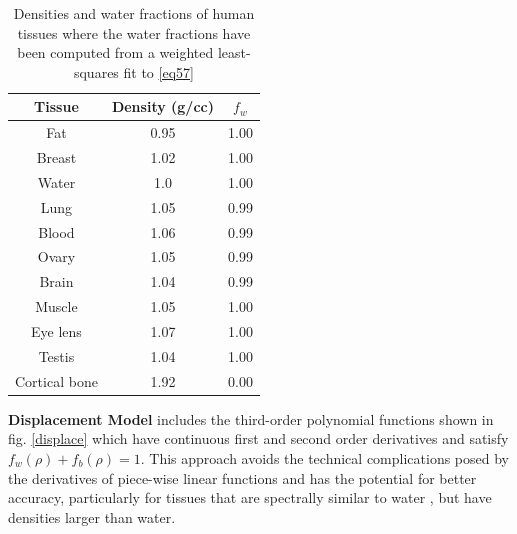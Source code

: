 \begin{table}[]
\centering
 \begin{tabular}{|c|c|c|} 
 \hline
 Tissue & Density (g/cc) & $f_w$ \\ \hline
 Fat & 0.95  & 1.00 \\  \hline
 Breast & 1.02  & 1.00  \\ \hline
 Water & 1.0  & 1.00  \\  \hline
 Lung & 1.05  & 0.99  \\  \hline
 Blood & 1.06 & 0.99 \\ \hline
 Ovary & 1.05  & 0.99  \\  \hline
 Brain & 1.04  & 0.99 \\  \hline
 Muscle & 1.05  & 1.00 \\  \hline
 Eye lens & 1.07  & 1.00  \\  \hline
 Testis & 1.04  & 1.00 \\  \hline
 Cortical bone & 1.92  & 0.00 \\  \hline
 
\end{tabular}
\caption{Densities and water fractions of human tissues where the water fractions have been computed from a weighted least-squares fit to \ref{eq57}}
\label{table3}
\end{table}

\textbf{Displacement Model} includes the third-order polynomial functions shown in fig. \ref{displace} which have continuous first and second order derivatives and satisfy $f_w(\rho) + f_b(\rho) = 1$. This approach avoids the technical complications posed by the derivatives of piece-wise linear functions and has the potential for better accuracy, particularly for tissues that are spectrally similar to water , but have densities larger than water.


